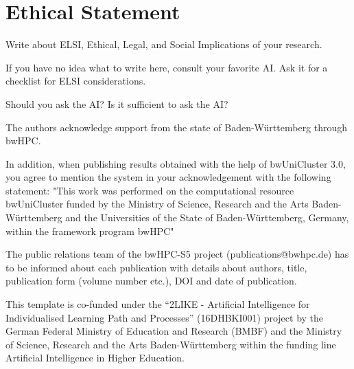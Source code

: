 \documentclass[sigconf, review, nonacm]{acmart}
\begin{document}
\section*{Ethical Statement}

Write about ELSI, \ie Ethical, Legal, and Social Implications of your research.

\begin{tcolorbox}[title=Instructions: How to write an ELSI statement?]
If you have no idea what to write here, consult your favorite AI. Ask it for a checklist for ELSI considerations. 

Should you ask the AI?
Is it sufficient to ask the AI?
\end{tcolorbox}


\begin{acks}

The authors acknowledge support from the state of Baden-Württemberg through bwHPC.



In addition, when publishing results obtained with the help of bwUniCluster 3.0, you agree to mention the system in your acknowledgement with the following statement:
"This work was performed on the computational resource bwUniCluster funded by the Ministry of Science, Research and the Arts Baden-Württemberg and the Universities of the State of Baden-Württemberg, Germany, within the framework program bwHPC"

The public relations team of the bwHPC-S5 project (publications@bwhpc.de) has to be informed about each publication with details about authors, title, publication form (volume number etc.), DOI and date of publication. 



This template is co-funded under the ``2LIKE - Artificial Intelligence for Individualised Learning Path and Processes'' (16DHBKI001)  project by the German Federal Ministry of Education and Research (BMBF) and the Ministry of Science, Research and the Arts Baden-Württemberg within the funding line Artificial Intelligence in Higher Education. 

\mysupervisorrole


\end{acks}
\end{document}
